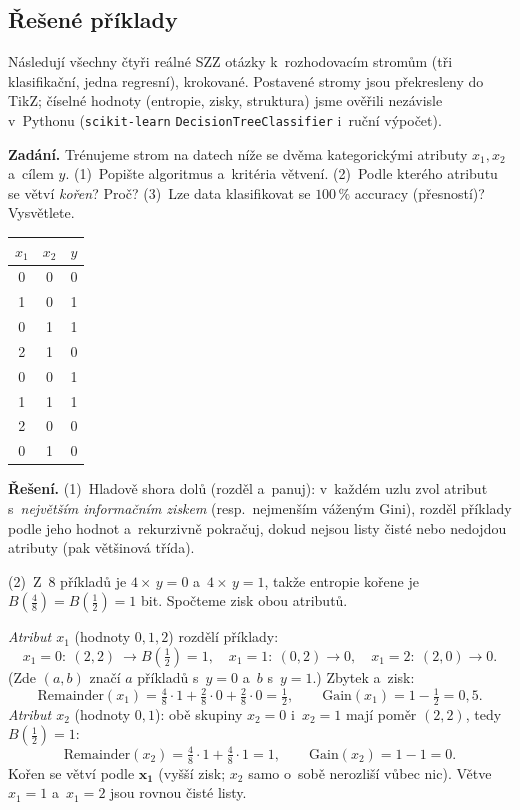 \subsection{Řešené příklady}

Následují všechny čtyři reálné SZZ otázky k~rozhodovacím stromům (tři klasifikační, jedna regresní), krokované. Postavené stromy jsou překresleny do TikZ; číselné hodnoty (entropie, zisky, struktura) jsme ověřili nezávisle v~Pythonu (\texttt{scikit-learn} \texttt{DecisionTreeClassifier} i~ruční výpočet).

\begin{priklad}
\par
\textbf{Zadání.} Trénujeme strom na datech níže se dvěma kategorickými atributy $x_1,x_2$ a~cílem $y$. (1)~Popište algoritmus a~kritéria větvení. (2)~Podle kterého atributu se větví \emph{kořen}? Proč? (3)~Lze data klasifikovat se $100\,\%$ accuracy (přesností)? Vysvětlete.

\smallskip
\begin{center}\small
\begin{tabular}{ccc}
\toprule
$x_1$ & $x_2$ & $y$ \\
\midrule
0 & 0 & 0 \\ 1 & 0 & 1 \\ 0 & 1 & 1 \\ 2 & 1 & 0 \\
0 & 0 & 1 \\ 1 & 1 & 1 \\ 2 & 0 & 0 \\ 0 & 1 & 0 \\
\bottomrule
\end{tabular}
\end{center}

\smallskip
\textbf{Řešení.} (1)~Hladově shora dolů (rozděl a~panuj): v~každém uzlu zvol atribut s~\emph{největším informačním ziskem} (resp.\ nejmenším váženým Gini), rozděl příklady podle jeho hodnot a~rekurzivně pokračuj, dokud nejsou listy čisté nebo nedojdou atributy (pak většinová třída).

\smallskip
(2)~Z~$8$ příkladů je $4\times\,y{=}0$ a~$4\times\,y{=}1$, takže entropie kořene je $B(\tfrac48)=B(\tfrac12)=\boxed{1}$ bit. Spočteme zisk obou atributů.

\emph{Atribut $x_1$} (hodnoty $0,1,2$) rozdělí příklady:
\[ x_1{=}0:\ (2,2)\ \to B(\tfrac12)=1,\quad x_1{=}1:\ (0,2)\to 0,\quad x_1{=}2:\ (2,0)\to 0. \]
(Zde $(a,b)$ značí $a$ příkladů s~$y{=}0$ a~$b$ s~$y{=}1$.) Zbytek a~zisk:
\[ \mathrm{Remainder}(x_1)=\tfrac48\cdot 1 + \tfrac28\cdot 0 + \tfrac28\cdot 0 = \tfrac12,\qquad \mathrm{Gain}(x_1)=1-\tfrac12=\boxed{0{,}5}. \]
\emph{Atribut $x_2$} (hodnoty $0,1$): obě skupiny $x_2{=}0$ i~$x_2{=}1$ mají poměr $(2,2)$, tedy $B(\tfrac12)=1$:
\[ \mathrm{Remainder}(x_2)=\tfrac48\cdot 1 + \tfrac48\cdot 1 = 1,\qquad \mathrm{Gain}(x_2)=1-1=\boxed{0}. \]
Kořen se větví podle $\mathbf{x_1}$ (vyšší zisk; $x_2$ samo o~sobě nerozliší vůbec nic). Větve $x_1{=}1$ a~$x_1{=}2$ jsou rovnou čisté listy.


\end{priklad}
